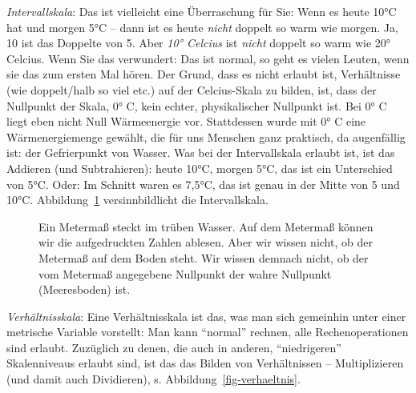 \documentclass[
  letterpaper,
  oneside,
  open=any]{scrbook}
\theoremstyle{definition}
\theoremstyle{definition}
\theoremstyle{definition}
\theoremstyle{remark}
\begin{document}
\emph{Intervallskala}: Das ist vielleicht eine Überraschung für Sie:
Wenn es heute 10°C hat und morgen 5°C -- dann ist es heute \emph{nicht}
doppelt so warm wie morgen. Ja, 10 ist das Doppelte von 5. Aber
\emph{10° Celcius} ist \emph{nicht} doppelt so warm wie 20° Celcius.
Wenn Sie das verwundert: Das ist normal, so geht es vielen Leuten, wenn
sie das zum ersten Mal hören. Der Grund, dass es nicht erlaubt ist,
Verhältnisse (wie doppelt/halb so viel etc.) auf der Celcius-Skala zu
bilden, ist, dass der Nullpunkt der Skala, 0° C, kein echter,
physikalischer Nullpunkt ist. Bei 0° C liegt eben nicht Null
Wärmeenergie vor. Stattdessen wurde mit 0° C eine Wärmenergiemenge
gewählt, die für uns Menschen ganz praktisch, da augenfällig ist: der
Gefrierpunkt von Wasser. Was bei der Intervallskala erlaubt ist, ist das
Addieren (und Subtrahieren): heute 10°C, morgen 5°C, das ist ein
Unterschied von 5°C. Oder: Im Schnitt waren es 7,5°C, das ist genau in
der Mitte von 5 und 10°C. Abbildung~\ref{fig-intervall} versinnbildlicht
die Intervallskala.

\begin{figure}


\caption{\label{fig-intervall}Ein Metermaß steckt im trüben Wasser. Auf
dem Metermaß können wir die aufgedruckten Zahlen ablesen. Aber wir
wissen nicht, ob der Metermaß auf dem Boden steht. Wir wissen demnach
nicht, ob der vom Metermaß angegebene Nullpunkt der wahre Nullpunkt
(Meeresboden) ist.}

\end{figure}%

\emph{Verhältnisskala}: Eine Verhältnisskala ist das, was man sich
gemeinhin unter einer metrische Variable vorstellt: Man kann
\enquote{normal} rechnen, alle Rechenoperationen sind erlaubt. Zuzüglich
zu denen, die auch in anderen, \enquote{niedrigeren} Skalenniveaus
erlaubt sind, ist das das Bilden von Verhältnissen -- Multiplizieren
(und damit auch Dividieren), s. Abbildung~\ref{fig-verhaeltnis}.
\end{document}

